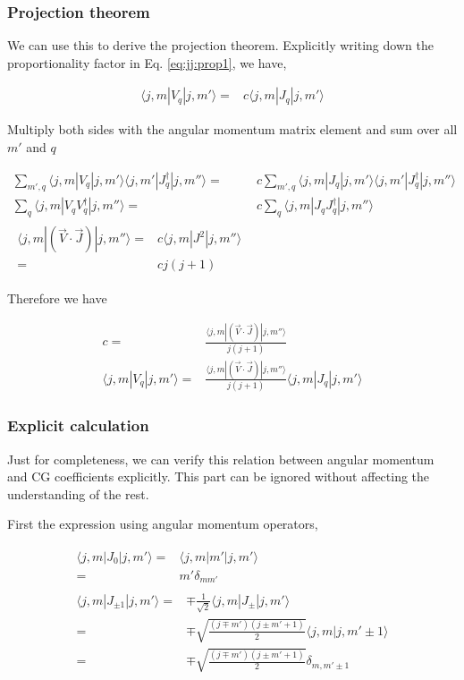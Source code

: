 \documentclass[10pt,fleqn]{article}
\newcommand{\eqar}[1]
{
  \begin{align}
    #1
  \end{align}
}
\begin{document}
\subsubsection{Projection theorem}\label{sec:general:projection-theorem}
We can use this to derive the projection theorem.
Explicitly writing down the proportionality factor in Eq. \ref{eq:jj:prop1}, we have,
\eqar{
  \langle j,m|V_q|j,m'\rangle=&c\langle j,m|J_q|j,m'\rangle
}
Multiply both sides with the angular momentum matrix element
and sum over all $m'$ and $q$
\eqar{
  \sum_{m',q}\langle j,m|V_q|j,m'\rangle\langle j,m'|J_q^\dagger|j,m''\rangle=&c\sum_{m',q}\langle j,m|J_q|j,m'\rangle\langle j,m'|J_q^\dagger|j,m''\rangle\\
  \sum_q\langle j,m|V_qV_q^\dagger|j,m''\rangle=&c\sum_q\langle j,m|J_qJ_q^\dagger|j,m''\rangle\\
  \begin{split}
    \langle j,m|(\vec V\cdot \vec J)|j,m''\rangle=&c\langle j,m|J^2|j,m''\rangle\\
    =&c j(j+1)
  \end{split}
}
Therefore we have
\eqar{
  c=&\frac{\langle j,m|(\vec V\cdot \vec J)|j,m''\rangle}{j(j+1)}\\
  \langle j,m|V_q|j,m'\rangle=&\frac{\langle j,m|(\vec V\cdot \vec J)|j,m''\rangle}{j(j+1)}\langle j,m|J_q|j,m'\rangle
}

\subsubsection{Explicit calculation}
Just for completeness, we can verify this relation between angular momentum
and CG coefficients explicitly.
This part can be ignored without affecting the understanding of the rest.

First the expression using angular momentum operators,
\eqar{
  \begin{split}
    \langle j,m|J_0|j,m'\rangle=&\langle j,m|m'|j,m'\rangle\\
    =&m'\delta_{mm'}
  \end{split}\\
  \begin{split}
    \langle j,m|J_{\pm1}|j,m'\rangle=&\mp\frac{1}{\sqrt2}\langle j,m|J_{\pm}|j,m'\rangle\\
    =&\mp\sqrt{\frac{(j\mp m')(j\pm m' + 1)}{2}}\langle j,m|j,m'\pm1\rangle\\
    =&\mp\sqrt{\frac{(j\mp m')(j\pm m' + 1)}{2}}\delta_{m,m'\pm1}
  \end{split}
}
\end{document}

